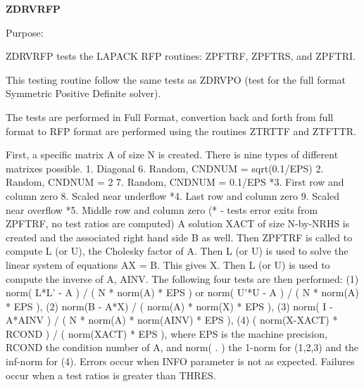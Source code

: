 {\bfseries Z\+D\+R\+V\+R\+F\+P} 

\begin{DoxyParagraph}{Purpose\+: }
\begin{DoxyVerb} ZDRVRFP tests the LAPACK RFP routines:
     ZPFTRF, ZPFTRS, and ZPFTRI.

 This testing routine follow the same tests as ZDRVPO (test for the full
 format Symmetric Positive Definite solver).

 The tests are performed in Full Format, convertion back and forth from
 full format to RFP format are performed using the routines ZTRTTF and
 ZTFTTR.

 First, a specific matrix A of size N is created. There is nine types of 
 different matrixes possible.
  1. Diagonal                        6. Random, CNDNUM = sqrt(0.1/EPS)
  2. Random, CNDNUM = 2              7. Random, CNDNUM = 0.1/EPS
 *3. First row and column zero       8. Scaled near underflow
 *4. Last row and column zero        9. Scaled near overflow
 *5. Middle row and column zero
 (* - tests error exits from ZPFTRF, no test ratios are computed)
 A solution XACT of size N-by-NRHS is created and the associated right
 hand side B as well. Then ZPFTRF is called to compute L (or U), the
 Cholesky factor of A. Then L (or U) is used to solve the linear system
 of equations AX = B. This gives X. Then L (or U) is used to compute the
 inverse of A, AINV. The following four tests are then performed:
 (1) norm( L*L' - A ) / ( N * norm(A) * EPS ) or
     norm( U'*U - A ) / ( N * norm(A) * EPS ),
 (2) norm(B - A*X) / ( norm(A) * norm(X) * EPS ),
 (3) norm( I - A*AINV ) / ( N * norm(A) * norm(AINV) * EPS ),
 (4) ( norm(X-XACT) * RCOND ) / ( norm(XACT) * EPS ),
 where EPS is the machine precision, RCOND the condition number of A, and
 norm( . ) the 1-norm for (1,2,3) and the inf-norm for (4).
 Errors occur when INFO parameter is not as expected. Failures occur when
 a test ratios is greater than THRES.\end{DoxyVerb}
 
\end{DoxyParagraph}

